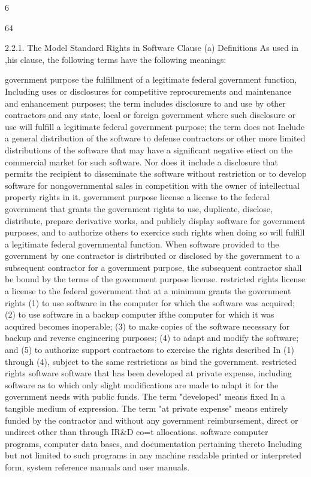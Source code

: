 \documentclass[12pt]{article}
\begin{document}
6

64

2.2.1. The Model Standard Rights in Software Clause
(a) Definitions
As used in ,his clause, the following terms have the following meanings:

government purpose
the fulfillment of a legitimate federal government function, Including uses or disclosures for competitive reprocurements and maintenance and enhancement purposes; the term includes disclosure to and use by other contractors and any
state, local or foreign government where such disclosure or use will fulfill a
legitimate federal government purpose; the term does not Include a general distribution of the software to defense contractors or other more limited distributions of
the software that may have a significant negative etiect on the commercial market for such software. Nor does it include a disclosure that permits the recipient
to disseminate the software without restriction or to develop software for nongovernmental
sales in competition with the owner of intellectual property rights in
it.
government purpose license
a license to the federal government that grants the government rights to use,
duplicate, disclose, distribute, prepare derivative works, and publicly display software for government purposes, and to authorize others to exercice such rights
when doing so will fulfill a legitimate federal governmental function. When software provided to the government by one contractor is distributed or disclosed by
the government to a subsequent contractor for a government purpose, the subsequent contractor shall be bound by the terms of the govemment purpose license.
restricted rights license
a license to the federal government that at a minimum grants the government
rights
(1) to use software in the computer for which the software was acquired;
(2) to use software in a backup computer ifthe computer for which it was
acquired becomes inoperable;
(3) to make copies of the software necessary for backup and reverse
engineering purposes;
(4) to adapt and modify the software; and
(5) to authorize support contractors to exercise the rights described In (1)
through (4), subject to the same restrictions as bind the government.
restricted rights software
software that has been developed at private expense, including software as to
which only slight modifications are made to adapt it for the government needs
with public funds. The term "developed" means fixed In a tangible medium of
expression. The term "at private expense" means entirely funded by the contractor and without any government reimbursement, direct or undirect other than
through IR\&D co=t allocations.
software
computer programs, computer data bases, and documentation pertaining thereto
Including but not limited to such programs in any machine readable printed or
interpreted form, system reference manuals and user manuals.
\end{document}
